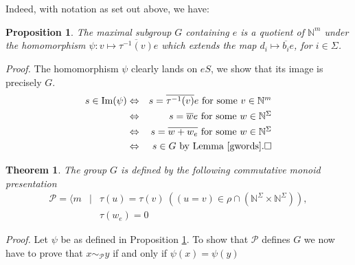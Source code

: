 \documentclass{acmconf}
\newtheorem{theorem}{Theorem}
\newtheorem{proposition}{Proposition}
\begin{document}
Indeed, with notation as set out above, we have:
\begin{proposition}\label{p:ggens}
The maximal subgroup $G$ containing $e$ is a quotient of 
$\mathbb{N}^m$ under the homomorphism
$\psi: v \mapsto \overline{\tau^{-1}(v)}e$ which extends the map
$d_i \mapsto \overline{b_i} e$, for $i \in \Sigma$.
\end{proposition}
\emph{Proof.}
The homomorphism $\psi$ clearly lands on $eS$, we show that
its image is precisely $G$.
\begin{eqnarray*}
s \in \mbox{Im}(\psi) & \Leftrightarrow & s = \overline{\tau^{-1}(v)}e \mbox{
for some $v \in \mathbb{N}^m$} \\
&\Leftrightarrow & s = \overline{w}e \mbox{ for some $w \in
\mathbb{N}^\Sigma$}\\
&\Leftrightarrow & s = \overline{w + w_e} \mbox{ for some $w \in
\mathbb{N}^\Sigma$}\\
&\Leftrightarrow & s \in G \mbox{ by Lemma \ref{gwords}.}\square
\end{eqnarray*}




\begin{theorem} \label{T:maxgroup}
The group $G$ is defined by the following commutative monoid presentation
\begin{eqnarray}
\label{rel7}\mathcal{P}=\langle m&\mid&
\tau(u)=\tau(v)\ 
((u=v)\in \rho\cap(\mathbb{N}^{\Sigma}\!\times\mathbb{N}^{\Sigma})),\\
\label{rel8}&&\tau(w_e)=0 
\end{eqnarray}
\end{theorem}
\emph{Proof.}
Let $\psi$ be as defined in Proposition \ref{p:ggens}.
To show that $\mathcal{P}$ defines $G$ we now have to prove
that $x\sim_{\mathcal{P}}y$ if and only if $\psi(x)=\psi(y)$ 
\end{document}
